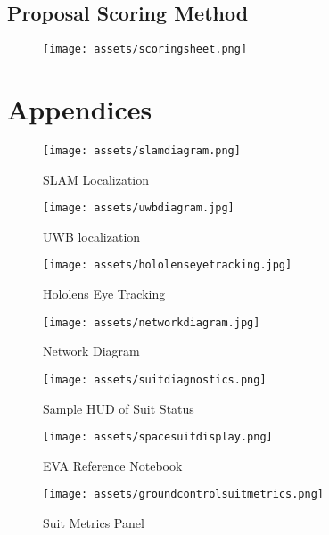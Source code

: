 \documentclass{article}
\let\Oldsection\section
\renewcommand{\section}{\FloatBarrier\Oldsection}
\let\Oldsubsection\subsection
\renewcommand{\subsection}{\FloatBarrier\Oldsubsection}
\begin{document}
\pagebreak

\subsection{Proposal Scoring Method}

\begin{figure}[!htb]
  \centering
  \texttt{[image: assets/scoringsheet.png]}
\end{figure}

\pagebreak

\section{Appendices}

\begin{figure}[!htb]
  \centering
  \texttt{[image: assets/slamdiagram.png]}
  \caption{SLAM Localization}
  \label{fig:slamdiagram}
\end{figure}

\begin{figure}[!htb]
  \centering
  \texttt{[image: assets/uwbdiagram.jpg]}
  \caption{UWB localization}
  \label{fig:uwbdiagram}
\end{figure}

\begin{figure}[!htb]
  \centering
  \texttt{[image: assets/hololenseyetracking.jpg]}
  \caption{Hololens Eye Tracking}
  \label{fig:hololenseyetracking}
\end{figure}

\begin{figure}[!htb]
  \centering
  \texttt{[image: assets/networkdiagram.jpg]}
  \caption{Network Diagram}
  \label{fig:networkdiagram}
\end{figure}

\begin{figure}[!htb]
  \centering
  \texttt{[image: assets/suitdiagnostics.png]}
  \caption{Sample HUD of Suit Status}
  \label{fig:suitdiagnostics}
\end{figure}

\begin{figure}[!htb]
  \centering
  \texttt{[image: assets/spacesuitdisplay.png]}
  \caption{EVA Reference Notebook}
  \label{fig:spacesuitdisplay}
\end{figure}

\begin{figure}[!htb]
  \centering
  \texttt{[image: assets/groundcontrolsuitmetrics.png]}
  \caption{Suit Metrics Panel}
  \label{fig:groundcontrolsuitmetrics}
\end{figure}
\end{document}
